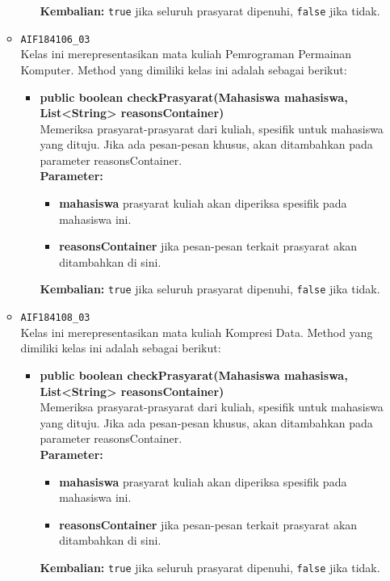 \begin{enumerate}
\begin{itemize}
\begin{itemize}
\begin{itemize}
			\end{itemize}
			\textbf{Kembalian:} \texttt{true} jika seluruh prasyarat dipenuhi, \texttt{false} jika tidak.
		\end{itemize}
		\item \texttt{AIF184106\_03} \\
		Kelas ini merepresentasikan mata kuliah Pemrograman Permainan Komputer. Method yang dimiliki kelas ini adalah sebagai berikut: 
		\begin{itemize}
			\item \textbf{public boolean checkPrasyarat(Mahasiswa mahasiswa, List<String> reasonsContainer)}\\
			Memeriksa prasyarat-prasyarat dari kuliah, spesifik untuk mahasiswa yang dituju. Jika ada pesan-pesan khusus, akan ditambahkan pada parameter reasonsContainer.\\
			\textbf{Parameter:}
			\begin{itemize}
				\item \textbf{mahasiswa} prasyarat kuliah akan diperiksa spesifik pada mahasiswa ini.
				\item \textbf{reasonsContainer} jika pesan-pesan terkait prasyarat akan ditambahkan di sini.
			\end{itemize}
			\textbf{Kembalian:} \texttt{true} jika seluruh prasyarat dipenuhi, \texttt{false} jika tidak.
		\end{itemize}
		\item \texttt{AIF184108\_03} \\
		Kelas ini merepresentasikan mata kuliah Kompresi Data. Method yang dimiliki kelas ini adalah sebagai berikut: 
		\begin{itemize}
			\item \textbf{public boolean checkPrasyarat(Mahasiswa mahasiswa, List<String> reasonsContainer)}\\
			Memeriksa prasyarat-prasyarat dari kuliah, spesifik untuk mahasiswa yang dituju. Jika ada pesan-pesan khusus, akan ditambahkan pada parameter reasonsContainer.\\
			\textbf{Parameter:}
			\begin{itemize}
				\item \textbf{mahasiswa} prasyarat kuliah akan diperiksa spesifik pada mahasiswa ini.
				\item \textbf{reasonsContainer} jika pesan-pesan terkait prasyarat akan ditambahkan di sini.
			\end{itemize}
			\textbf{Kembalian:} \texttt{true} jika seluruh prasyarat dipenuhi, \texttt{false} jika tidak.

\end{itemize}
\end{itemize}
\end{enumerate}
